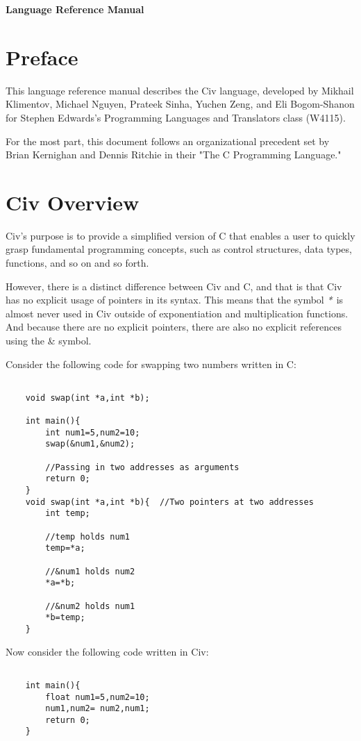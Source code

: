 \documentclass[a4paper]{article}
\def \authors{Mikhail Klimentov, Michael Nguyen, Prateek Sinha, Yuchen Zeng, and Eli Bogom-Shanon }
\begin{document}
\textbf{\huge{Language Reference Manual}}

\section{Preface}

This language reference manual describes the Civ language, developed by \authors for Stephen Edwards's Programming Languages and Translators class (W4115). 

For the most part, this document follows an organizational precedent set by Brian Kernighan and Dennis Ritchie in their "The C Programming Language." 

\section{Civ Overview}

Civ's purpose is to provide a simplified version of C that enables a user to quickly grasp fundamental programming concepts, such as control structures, data types, functions, and so on and so forth.

However, there is a distinct difference between Civ and C, and that is that Civ has no explicit usage of pointers in its syntax. This means that the symbol $\emph{*}$ is almost never used in Civ outside of exponentiation and multiplication functions. And because there are no explicit pointers, there are also no explicit references using the \& symbol.

Consider the following code for swapping two numbers written in C:

{\selectfont
\begin{lstlisting}

	void swap(int *a,int *b);

	int main(){
		int num1=5,num2=10;
		swap(&num1,&num2);
        
        //Passing in two addresses as arguments
		return 0;
	}
	void swap(int *a,int *b){  //Two pointers at two addresses
  		int temp;
        
        //temp holds num1
  		temp=*a;
        
        //&num1 holds num2
 	 	*a=*b;
        
        //&num2 holds num1
  		*b=temp;
	}
\end{lstlisting}
}

Now consider the following code written in Civ:

{\selectfont
\begin{lstlisting}
    
	int main(){
		float num1=5,num2=10;
		num1,num2= num2,num1;
		return 0;
	}
\end{lstlisting}
} 
\end{document}
